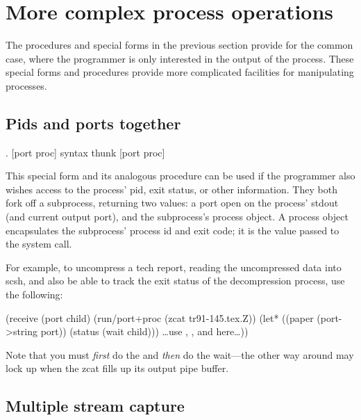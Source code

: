 \section{More complex process operations}
The procedures and special forms in the previous section provide for the
common case, where the programmer is only interested in the output of the
process.
These special forms and procedures provide more complicated facilities
for manipulating processes.


\subsection{Pids and ports together}
 {. } {[port proc]} {syntax}
 {thunk}  {[port proc]}
\begin{desc}
This special form and its analogous procedure can be used
if the programmer also wishes access to the process' pid, exit status, 
or other information.
They both fork off a subprocess, returning two values:
a port open on the process' stdout (and current output port), 
and the subprocess's process object.
A process object encapsulates the subprocess' process id and exit code;
it is the value passed to the  system call.


For example, to uncompress a tech report, reading the uncompressed
data into scsh, and also be able to track the exit status of
the decompression process, use the following:
\begin{code}
(receive (port child) (run/port+proc (zcat tr91-145.tex.Z))
  (let* ((paper (port->string port))
         (status (wait child)))
    {\rm\ldots{}use , , and  here\ldots}))\end{code}
%
Note that you must \emph{first} do the  and 
\emph{then} do the wait---the other way around may lock up when the
zcat fills up its output pipe buffer.
\end{desc}


\subsection{Multiple stream capture}

